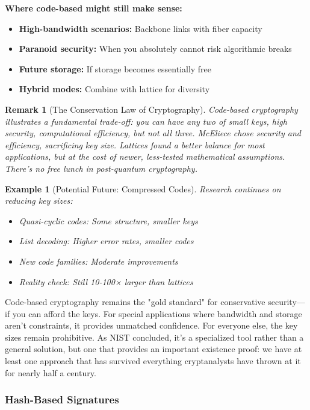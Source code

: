 \documentclass[11pt,a4paper]{article}
\newtheorem{example}{Example}
\newtheorem{remark}{Remark}
\begin{document}
\textbf{Where code-based might still make sense:}
\begin{itemize}
    \item \textbf{High-bandwidth scenarios:} Backbone links with fiber capacity
    \item \textbf{Paranoid security:} When you absolutely cannot risk algorithmic breaks
    \item \textbf{Future storage:} If storage becomes essentially free
    \item \textbf{Hybrid modes:} Combine with lattice for diversity
\end{itemize}

\begin{remark}[The Conservation Law of Cryptography]
Code-based cryptography illustrates a fundamental trade-off: you can have any two of {small keys, high security, computational efficiency}, but not all three. McEliece chose security and efficiency, sacrificing key size. Lattices found a better balance for most applications, but at the cost of newer, less-tested mathematical assumptions. There's no free lunch in post-quantum cryptography.
\end{remark}

\begin{example}[Potential Future: Compressed Codes]
Research continues on reducing key sizes:
\begin{itemize}
    \item Quasi-cyclic codes: Some structure, smaller keys
    \item List decoding: Higher error rates, smaller codes
    \item New code families: Moderate improvements
    \item Reality check: Still 10-100× larger than lattices
\end{itemize}
\end{example}

Code-based cryptography remains the "gold standard" for conservative security—if you can afford the keys. For special applications where bandwidth and storage aren't constraints, it provides unmatched confidence. For everyone else, the key sizes remain prohibitive. As NIST concluded, it's a specialized tool rather than a general solution, but one that provides an important existence proof: we have at least one approach that has survived everything cryptanalysts have thrown at it for nearly half a century.

\subsubsection{Hash-Based Signatures}
\end{document}
